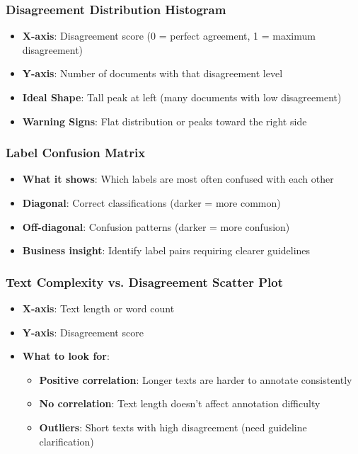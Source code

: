 \documentclass[11pt]{article}
\begin{document}
\subsubsection{Disagreement Distribution Histogram}
\begin{itemize}
\item \textbf{X-axis}: Disagreement score (0 = perfect agreement, 1 = maximum disagreement)
\item \textbf{Y-axis}: Number of documents with that disagreement level
\item \textbf{Ideal Shape}: Tall peak at left (many documents with low disagreement)
\item \textbf{Warning Signs}: Flat distribution or peaks toward the right side
\end{itemize}

\subsubsection{Label Confusion Matrix}
\begin{itemize}
\item \textbf{What it shows}: Which labels are most often confused with each other
\item \textbf{Diagonal}: Correct classifications (darker = more common)
\item \textbf{Off-diagonal}: Confusion patterns (darker = more confusion)
\item \textbf{Business insight}: Identify label pairs requiring clearer guidelines
\end{itemize}

\subsubsection{Text Complexity vs. Disagreement Scatter Plot}
\begin{itemize}
\item \textbf{X-axis}: Text length or word count
\item \textbf{Y-axis}: Disagreement score
\item \textbf{What to look for}:
\begin{itemize}
\item \textbf{Positive correlation}: Longer texts are harder to annotate consistently
\item \textbf{No correlation}: Text length doesn't affect annotation difficulty
\item \textbf{Outliers}: Short texts with high disagreement (need guideline clarification)
\end{itemize}
\end{itemize}
\end{document}
